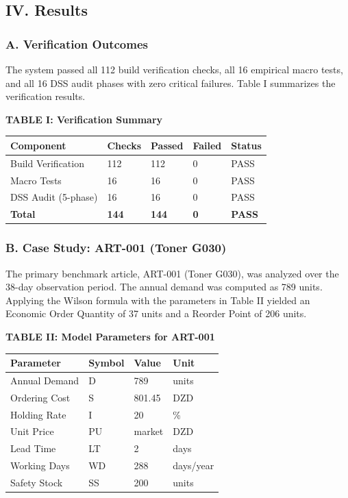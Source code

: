 ﻿\documentclass[conference]{IEEEtran}
\begin{document}
\subsection{IV. Results}\label{iv.-results}

\subsubsection{A. Verification Outcomes}\label{a.-verification-outcomes}

The system passed all 112 build verification checks, all 16 empirical
macro tests, and all 16 DSS audit phases with zero critical failures.
Table I summarizes the verification results.

\textbf{TABLE I: Verification Summary}

{\def\LTcaptype{none} %
\begin{longtable}[]{@{}lllll@{}}
\toprule\noalign{}
Component & Checks & Passed & Failed & Status \\
\midrule\noalign{}
\endhead
\bottomrule\noalign{}
\endlastfoot
Build Verification & 112 & 112 & 0 & PASS \\
Macro Tests & 16 & 16 & 0 & PASS \\
DSS Audit (5-phase) & 16 & 16 & 0 & PASS \\
\textbf{Total} & \textbf{144} & \textbf{144} & \textbf{0} &
\textbf{PASS} \\
\end{longtable}
}

\subsubsection{B. Case Study: ART-001 (Toner
G030)}\label{b.-case-study-art-001-toner-g030}

The primary benchmark article, ART-001 (Toner G030), was analyzed over
the 38-day observation period. The annual demand was computed as 789
units. Applying the Wilson formula with the parameters in Table II
yielded an Economic Order Quantity of 37 units and a Reorder Point of
206 units.

\textbf{TABLE II: Model Parameters for ART-001}

{\def\LTcaptype{none} %
\begin{longtable}[]{@{}llll@{}}
\toprule\noalign{}
Parameter & Symbol & Value & Unit \\
\midrule\noalign{}
\endhead
\bottomrule\noalign{}
\endlastfoot
Annual Demand & D & 789 & units \\
Ordering Cost & S & 801.45 & DZD \\
Holding Rate & I & 20 & \% \\
Unit Price & PU & market & DZD \\
Lead Time & LT & 2 & days \\
Working Days & WD & 288 & days/year \\
Safety Stock & SS & 200 & units \\
\end{longtable}
}
\end{document}
